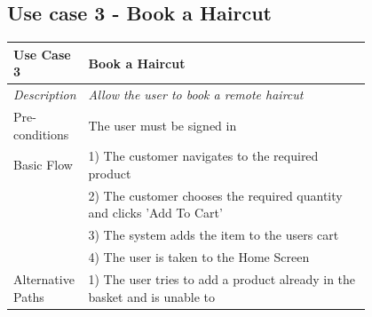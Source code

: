 \documentclass[12pt]{article}
\begin{document}
	\subsection{Use case 3 - Book a Haircut}
	\label{chap:use-cases-3}
	\begin{table}[H]
		\begin{tabular}{|l|p{0.8\linewidth}}
			\hline
			\rowcolor[HTML]{EFEFEF} 
			\textbf{Use Case 3}  & \textbf{Book a Haircut}                                                   \\ \hline
			\rowcolor[HTML]{F5FBFF} 
			\textit{Description} & \textit{Allow the user to book a remote haircut}                                 \\ \hline
			\rowcolor[HTML]{EFEFEF} 
			Pre-conditions       & The user must be signed in                                                \\ \hline
			\rowcolor[HTML]{F5FBFF} 
			Basic Flow           & 1) The customer navigates to the required product                         \\
			\rowcolor[HTML]{F5FBFF} 
			& 2) The customer chooses the required quantity and clicks 'Add To Cart'    \\
			\rowcolor[HTML]{F5FBFF} 
			& 3) The system adds the item to the users cart                             \\
			\rowcolor[HTML]{F5FBFF} 
			& 4) The user is taken to the Home Screen                                   \\ \hline
			\rowcolor[HTML]{EFEFEF} 
			Alternative Paths    & 1) The user tries to add a product already in the basket and is unable to
		\end{tabular}
	\end{table}
\end{document}
